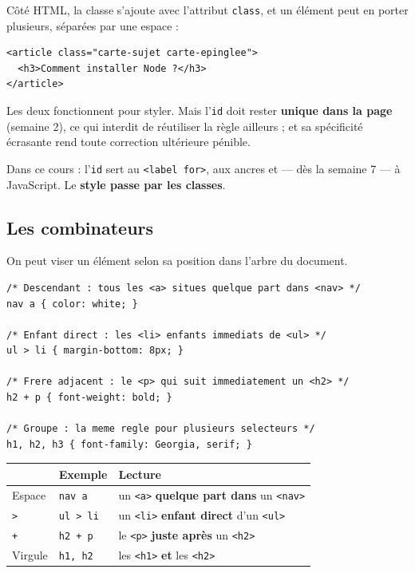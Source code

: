 \documentclass[a4paper,11pt]{article}
\newcommand{\hdr}[1]{\multicolumn{1}{l}{\color{white}\bfseries #1}}
\renewcommand{\arraystretch}{1.3}
\begin{document}
Côté HTML, la classe s'ajoute avec l'attribut \texttt{class}, et un élément peut en porter plusieurs, séparées par une espace :

\begin{lstlisting}[language=HTML5, caption={Un élément, deux classes}]
<article class="carte-sujet carte-epinglee">
  <h3>Comment installer Node ?</h3>
</article>
\end{lstlisting}

\begin{tcolorbox}[attention, title={Classe ou identifiant ? La classe, presque toujours}]
Les deux fonctionnent pour styler. Mais l'\texttt{id} doit rester \textbf{unique dans la page} (semaine 2), ce qui interdit de réutiliser la règle ailleurs ; et sa spécificité écrasante rend toute correction ultérieure pénible.

\vspace{3pt}
Dans ce cours : l'\texttt{id} sert au \texttt{<label for>}, aux ancres et --- dès la semaine 7 --- à JavaScript. Le \textbf{style passe par les classes}.
\end{tcolorbox}

\subsection{Les combinateurs}

On peut viser un élément selon sa position dans l'arbre du document.

\begin{lstlisting}[language=CSS3, caption={Quatre façons de combiner}]
/* Descendant : tous les <a> situes quelque part dans <nav> */
nav a { color: white; }

/* Enfant direct : les <li> enfants immediats de <ul> */
ul > li { margin-bottom: 8px; }

/* Frere adjacent : le <p> qui suit immediatement un <h2> */
h2 + p { font-weight: bold; }

/* Groupe : la meme regle pour plusieurs selecteurs */
h1, h2, h3 { font-family: Georgia, serif; }
\end{lstlisting}

\begin{center}
\renewcommand{\arraystretch}{1.0}
\begin{tabularx}{\linewidth}{p{2.6cm}p{2.6cm}X}
  \toprule
  \rowcolor{uniNavy}
  \hdr{Combinateur} & \hdr{Exemple} & \hdr{Lecture} \\
  \midrule
  \rowcolor{uniPaper}
  Espace & \texttt{nav a} & un \texttt{<a>} \textbf{quelque part dans} un \texttt{<nav>} \\
  \texttt{>} & \texttt{ul > li} & un \texttt{<li>} \textbf{enfant direct} d'un \texttt{<ul>} \\
  \rowcolor{uniPaper}
  \texttt{+} & \texttt{h2 + p} & le \texttt{<p>} \textbf{juste après} un \texttt{<h2>} \\
  Virgule & \texttt{h1, h2} & les \texttt{<h1>} \textbf{et} les \texttt{<h2>} \\
  \bottomrule
\end{tabularx}
\end{center}
\end{document}

